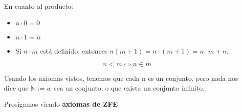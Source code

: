 	\begin{defn}
		En cuanto al producto:
		\begin{itemize}
			\item $n\cdot0 = 0$
			\item $n\cdot1=n$
			\item Si $n\cdot m$ está definido, entonces $n(m+1) = n\cdot (m+1) = n\cdot m + n$.
		\end{itemize}
	\end{defn}

	\begin{defn}[Menor]
		$$n<m\iff n\in m$$
	\end{defn}

	Usando los axiomas vistos, tenemos que cada n es un conjunto, pero nada nos dice que $\mathbb{N} :=w$ sea un conjunto, o que exista un conjunto infinito.

	Prosigamos viendo \textbf{axiomas de ZFE}

